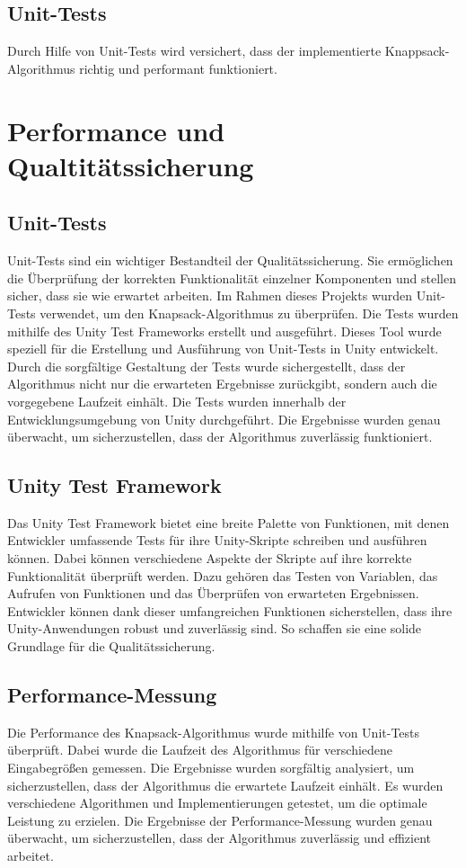 \subsection{Unit-Tests}
Durch Hilfe von Unit-Tests wird versichert, dass der implementierte Knappsack-Algorithmus
richtig und performant funktioniert.

\section{Performance und Qualtitätssicherung}
\subsection{Unit-Tests}
Unit-Tests sind ein wichtiger Bestandteil der Qualitätssicherung. Sie ermöglichen die Überprüfung der korrekten
Funktionalität einzelner Komponenten und stellen sicher, dass sie wie erwartet arbeiten. Im Rahmen dieses Projekts wurden
Unit-Tests verwendet, um den Knapsack-Algorithmus zu überprüfen.  Die Tests wurden mithilfe des Unity Test Frameworks
erstellt und ausgeführt. Dieses Tool wurde speziell für die Erstellung und Ausführung von Unit-Tests in Unity entwickelt.
Durch die sorgfältige Gestaltung der Tests wurde sichergestellt, dass der Algorithmus nicht nur die erwarteten Ergebnisse
zurückgibt, sondern auch die vorgegebene Laufzeit einhält. Die Tests wurden innerhalb der Entwicklungsumgebung von Unity
durchgeführt. Die Ergebnisse wurden genau überwacht, um sicherzustellen, dass der Algorithmus zuverlässig funktioniert.

\subsection{Unity Test Framework}
Das Unity Test Framework bietet eine breite Palette von Funktionen, mit denen Entwickler umfassende Tests für ihre
Unity-Skripte schreiben und ausführen können. Dabei können verschiedene Aspekte der Skripte auf ihre korrekte Funktionalität
überprüft werden. Dazu gehören das Testen von Variablen, das Aufrufen von Funktionen und das Überprüfen von erwarteten
Ergebnissen. Entwickler können dank dieser umfangreichen Funktionen sicherstellen, dass ihre Unity-Anwendungen robust
und zuverlässig sind. So schaffen sie eine solide Grundlage für die Qualitätssicherung.

\subsection{Performance-Messung}
Die Performance des Knapsack-Algorithmus wurde mithilfe von Unit-Tests überprüft. Dabei wurde die Laufzeit des Algorithmus
für verschiedene Eingabegrößen gemessen. Die Ergebnisse wurden sorgfältig analysiert, um sicherzustellen, dass der Algorithmus
die erwartete Laufzeit einhält. Es wurden verschiedene Algorithmen und Implementierungen getestet, um die optimale
Leistung zu erzielen. Die Ergebnisse der Performance-Messung wurden genau überwacht, um sicherzustellen, dass der
Algorithmus zuverlässig und effizient arbeitet.

